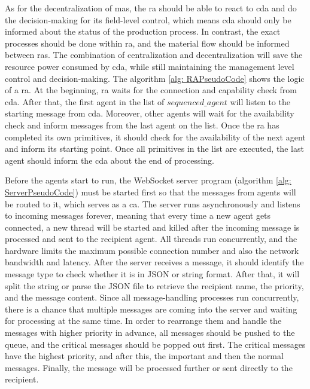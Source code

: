 As for the decentralization of \gls{mas}, the \gls{ra} should be able to react to \gls{cda} and do the decision-making for its field-level control, which means \gls{cda} should only be informed about the status of the production process. In contrast, the exact processes should be done within \gls{ra}, and the material flow should be informed between \gls{ras}. The combination of centralization and decentralization will save the resource power consumed by \gls{cda}, 
while still maintaining the management level control and decision-making.  
The algorithm \ref{alg: RAPseudoCode} shows the logic of a \gls{ra}. At the beginning, \gls{ra} waits for the connection and capability check from \gls{cda}. After that, the first agent in the list of $sequenced\_agent$ will listen to the starting message from \gls{cda}. 
Moreover, other agents will wait for the availability check and inform messages from the last agent on the list. 
Once the \gls{ra} has completed its own primitives, it should check for the availability of the next agent and inform its starting point. 
Once all primitives in the list are executed, the last agent should inform the \gls{cda} about the end of processing.


Before the agents start to run, the WebSocket server program (algorithm \ref{alg: ServerPseudoCode}) must be started first so that the messages from agents will be routed to it, which serves as a \gls{ca}.  
The server runs asynchronously and listens to incoming messages forever, meaning that every time a new agent gets connected, a new thread will be started and killed after the incoming message is processed and sent to the recipient agent. 
All threads run concurrently, and the hardware limits the maximum possible connection number and also the network bandwidth and latency. 
After the server receives a message, it should identify the message type to check whether it is in JSON or string format. 
After that, it will split the string or parse the JSON file to retrieve the recipient name, the priority, and the message content. 
Since all message-handling processes run concurrently, there is a chance that multiple messages are coming into the server and waiting for processing at the same time. 
In order to rearrange them and handle the messages with higher priority in advance, all messages should be pushed to the queue, and the critical messages should be popped out first. The critical messages have the highest priority, and after this, the important and then the normal messages. 
Finally, the message will be processed further or sent directly to the recipient. 
   
